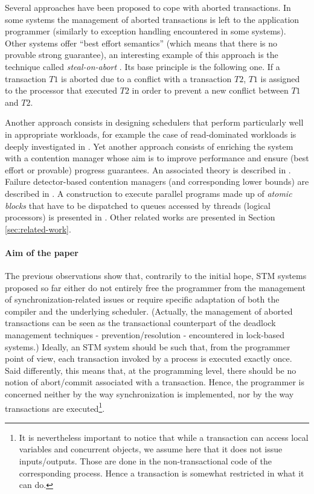 Several approaches have been proposed to cope with  aborted transactions.
In some systems the  management of aborted transactions
is left to the application programmer (similarly to  exception handling
encountered  in  some systems). 
%
Other systems  offer   ``best effort semantics'' 
(which  means that there is no provable  strong guarantee),
an interesting example of this approach is the  technique
called  {\it steal-on-abort} \cite{ALKJKW09}. 
 Its  base principle is the  following one.  If  a transaction $T1$
is  aborted  due to  a  conflict with a transaction  $T2$,  $T1$ is
assigned to  the processor  that executed  $T2$ in order  to prevent  
a new conflict between   $T1$ and  $T2$. 

Another approach consists in designing  schedulers that perform 
particularly well in appropriate workloads, for example the case of
read-dominated workloads is deeply investigated in \cite{AM09}.
%
Yet another approach consists of enriching the system with a 
contention manager whose aim is to  improve performance and
ensure (best effort or provable) progress guarantees. 
An associated theory is described in \cite{GHP05}. 
Failure detector-based contention managers (and corresponding 
lower bounds) are described in \cite{GKK08}. 
A construction to execute  parallel programs made up of {\it atomic blocks} 
that have to be dispatched to queues accessed by threads (logical processors) 
is presented in \cite{WF10}. 
%
Other related works are presented in Section \ref{sec:related-work}.

\paragraph{Aim  of the paper}
The previous observations show that, contrarily to the initial hope, 
STM systems proposed so far either do not entirely free
the  programmer from  the  management of synchronization-related  
issues  or  require specific adaptation of both the compiler and 
the underlying  scheduler.
(Actually,  the  management of aborted transactions can be seen as the
transactional  counterpart  of the deadlock management techniques 
- prevention/resolution - encountered in lock-based systems.) 
Ideally, an STM system should be  such that, from the programmer point of
view,  each  transaction invoked by a process  is   executed exactly once.  
Said differently, this means that, at the programming level,  
there   should   be  no  notion   of    abort/commit    associated  with  a
transaction. Hence, the programmer is
concerned neither by the way synchronization is implemented, nor by the way 
transactions are executed\footnote{It is nevertheless important to 
notice that while a transaction can access local variables and 
concurrent objects, we  assume here that it does not issue inputs/outputs.
Those are done in the non-transactional code of the corresponding process.
Hence a transaction is somewhat restricted in what it can do.}.

